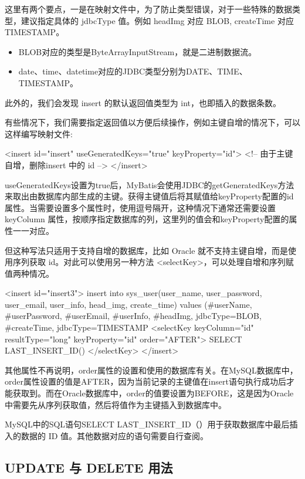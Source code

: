 这里有两个要点，一是在映射文件中，为了防止类型错误，对于一些特殊的数据类型，建议指定具体的 jdbcType 值。例如 headImg 对应 BLOB, createTime 对应 TIMESTAMP。
\begin{itemize}
    \item BLOB对应的类型是ByteArrayInputStream，就是二进制数据流。
    \item date、time、datetime对应的JDBC类型分别为DATE、TIME、TIMESTAMP。
\end{itemize}

此外的，我们会发现 insert 的默认返回值类型为 int，也即插入的数据条数。

有些情况下，我们需要指定返回值以方便后续操作，例如主键自增的情况下，可以这样编写映射文件:
\begin{xml}
<insert id="insert" useGeneratedKeys="true" keyProperty="id">
    <!-- 由于主键自增，删除insert 中的 id -->
</insert>
\end{xml}

useGeneratedKeys设置为true后，MyBatis会使用JDBC的getGeneratedKeys方法来取出由数据库内部生成的主键。获得主键值后将其赋值给keyProperty配置的id属性。当需要设置多个属性时，使用逗号隔开，这种情况下通常还需要设置 keyColumn 属性，按顺序指定数据库的列，这里列的值会和keyProperty配置的属性一一对应。

但这种写法只适用于支持自增的数据库，比如 Oracle 就不支持主键自增，而是使用序列获取 id。对此可以使用另一种方法 <selectKey>，可以处理自增和序列赋值两种情况。

\begin{xml}
<insert id="insert3">
    insert into sys_user(user_name, user_password, user_email, user_info, head_img, create_time)
    values (#{userName}, #{userPassword}, #{userEmail}, #{userInfo}, #{headImg, jdbcType=BLOB}, #{createTime, jdbcType=TIMESTAMP}
    <selectKey keyColumn="id" resultType="long" keyProperty="id" order="AFTER">
        SELECT LAST_INSERT_ID()
    </selectKey>
</insert>
\end{xml}

其他属性不再说明，order属性的设置和使用的数据库有关。在MySQL数据库中，order属性设置的值是AFTER，因为当前记录的主键值在insert语句执行成功后才能获取到。而在Oracle数据库中，order的值要设置为BEFORE，这是因为Oracle中需要先从序列获取值，然后将值作为主键插入到数据库中。

MySQL中的SQL语句SELECT LAST\_INSERT\_ID（）用于获取数据库中最后插入的数据的 ID 值。其他数据对应的语句需要自行查阅。

\subsection{UPDATE 与 DELETE 用法}

